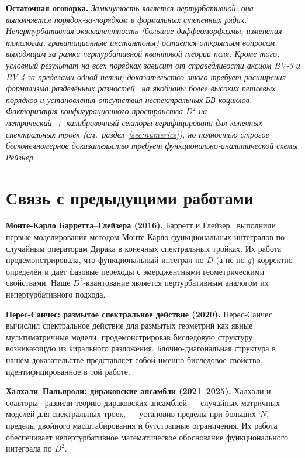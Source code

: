 \documentclass[12pt,a4paper]{article}
\theoremstyle{definition}
\theoremstyle{remark}
\begin{document}
\medskip
\noindent\textbf{Остаточная оговорка.}
\emph{Замкнутость является пертурбативной: она выполняется
порядок-за-порядком в формальных степенных рядах.  Непертурбативная
эквивалентность (большие диффеоморфизмы, изменения топологии,
гравитационные инстантоны) остаётся открытым вопросом, выходящим за
рамки пертурбативной квантовой теории поля.  Кроме того, условный
результат на всех порядках зависит от справедливости аксиом BV-3 и BV-4
за пределами одной петли; доказательство этого требует расширения
формализма разделённых разностей~\cite{vanNuland:2021oneloop} на
якобианы более высоких петлевых порядков и установления отсутствия
неспектральных БВ-коциклов.  Факторизация конфигурационного
пространства $D^2$ на метрический~+~калибровочный секторы
верифицирована для конечных спектральных троек
(см.\ раздел~\ref{sec:numerics}), но полностью строгое
бесконечномерное доказательство требует функционально-аналитической
схемы Рейзнер~\cite{Rejzner:2016book}.}

\section{Связь с предыдущими работами}
\label{sec:related}

\textbf{Монте-Карло Барретта--Глейзера (2016).}
Барретт и Глейзер~\cite{Barrett:2016monte} выполнили первые
моделирования методом Монте-Карло функциональных интегралов по
случайным операторам Дирака в конечных спектральных тройках.  Их
работа продемонстрировала, что функциональный интеграл по $D$ (а не
по $g$) корректно определён и даёт фазовые переходы с эмерджентными
геометрическими свойствами.  Наше $D^2$-квантование является
пертурбативным аналогом их непертурбативного подхода.

\smallskip\noindent
\textbf{Перес-Санчес: размытое спектральное действие (2020).}
Перес-Санчес~\cite{PerezSanchez:2020fuzzy} вычислил спектральное
действие для размытых геометрий как явные мультиматричные модели,
продемонстрировав биследовую структуру, возникающую из кирального
разложения.  Блочно-диагональная структура в нашем доказательстве
представляет собой именно биследовое свойство, идентифицированное в
той работе.

\smallskip\noindent
\textbf{Халхали--Пальяроли: дираковские ансамбли (2021--2025).}
Халхали и соавторы~\cite{Khalkhali:2021dirac, Hessam:2022doublescaling,
Khalkhali:2025bootstrap} развили теорию дираковских ансамблей ---
случайных матричных моделей для спектральных троек, --- установив
пределы при больших~$N$, пределы двойного масштабирования и
бутстрапные ограничения.  Их работа обеспечивает непертурбативное
математическое обоснование функционального интеграла по $D^2$.
\end{document}
